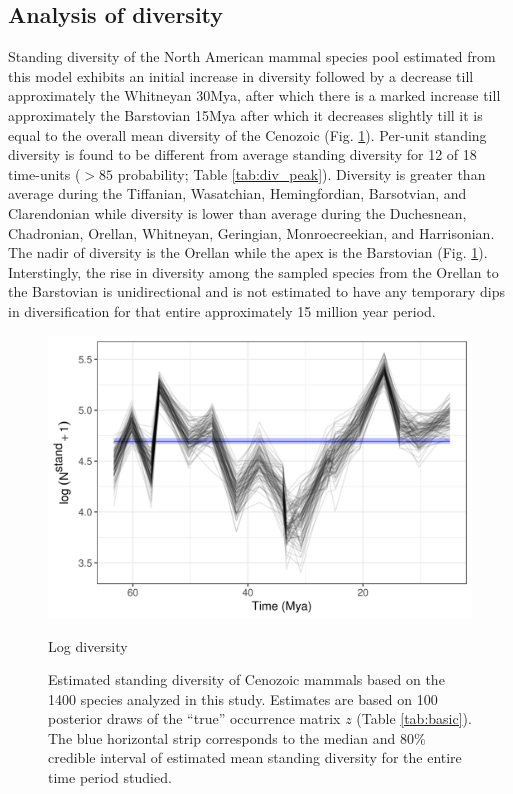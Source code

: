 \documentclass[12pt,letterpaper]{article}
\begin{document}
\subsection*{Analysis of diversity}
Standing diversity of the North American mammal species pool estimated from this model exhibits an initial increase in diversity followed by a decrease till approximately the Whitneyan 30Mya, after which there is a marked increase till approximately the Barstovian 15Mya after which it decreases slightly till it is equal to the overall mean diversity of the Cenozoic (Fig. \ref{fig:diversity_est}). Per-unit standing diversity is found to be different from average standing diversity for 12 of 18 time-units (\(> 85\) probability; Table \ref{tab:div_peak}). Diversity is greater than average during the Tiffanian, Wasatchian, Hemingfordian, Barsotvian, and Clarendonian while diversity is lower than average during the Duchesnean, Chadronian, Orellan, Whitneyan, Geringian, Monroecreekian, and Harrisonian. The nadir of diversity is the Orellan while the apex is the Barstovian (Fig. \ref{fig:diversity_est}). Interstingly, the rise in diversity among the sampled species from the Orellan to the Barstovian is unidirectional and is not estimated to have any temporary dips in diversification for that entire approximately 15 million year period.
\begin{figure}[ht]
  \centering
  \includegraphics[width=\textwidth,height=0.5\textheight,keepaspectratio=true]{figure/log_diversity}
  \caption{Log diversity}
  \caption{Estimated standing diversity of Cenozoic mammals based on the 1400 species analyzed in this study. Estimates are based on 100 posterior draws of the ``true'' occurrence matrix \(z\) (Table \ref{tab:basic}). The blue horizontal strip corresponds to the median and 80\% credible interval of estimated mean standing diversity for the entire time period studied.} 
  \label{fig:diversity_est}
\end{figure}
\end{document}
